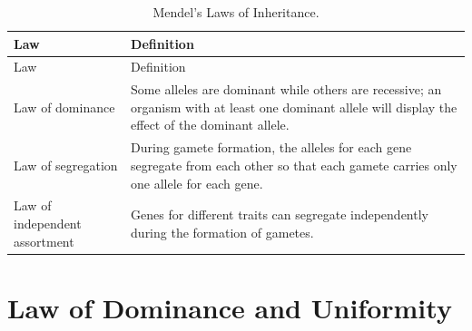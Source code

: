 \begin{longtable}[]{@{}ll@{}}
\caption{\label{tab:mendel} Mendel's Laws of Inheritance.}\tabularnewline
\toprule
\begin{minipage}[b]{0.22\columnwidth}\raggedright
Law\strut
\end{minipage} & \begin{minipage}[b]{0.72\columnwidth}\raggedright
Definition\strut
\end{minipage}\tabularnewline
\midrule
\endfirsthead
\toprule
\begin{minipage}[b]{0.22\columnwidth}\raggedright
Law\strut
\end{minipage} & \begin{minipage}[b]{0.72\columnwidth}\raggedright
Definition\strut
\end{minipage}\tabularnewline
\midrule
\endhead
\begin{minipage}[t]{0.22\columnwidth}\raggedright
Law of dominance\strut
\end{minipage} & \begin{minipage}[t]{0.72\columnwidth}\raggedright
Some alleles are dominant while others are recessive; an organism with at least one dominant allele will display the effect of the dominant allele.\strut
\end{minipage}\tabularnewline
\begin{minipage}[t]{0.22\columnwidth}\raggedright
Law of segregation\strut
\end{minipage} & \begin{minipage}[t]{0.72\columnwidth}\raggedright
During gamete formation, the alleles for each gene segregate from each other so that each gamete carries only one allele for each gene.\strut
\end{minipage}\tabularnewline
\begin{minipage}[t]{0.22\columnwidth}\raggedright
Law of independent assortment\strut
\end{minipage} & \begin{minipage}[t]{0.72\columnwidth}\raggedright
Genes for different traits can segregate independently during the formation of gametes.\strut
\end{minipage}\tabularnewline
\bottomrule
\end{longtable}

\hypertarget{law-of-dominance-and-uniformity}{%
\section{Law of Dominance and Uniformity}\label{law-of-dominance-and-uniformity}}

